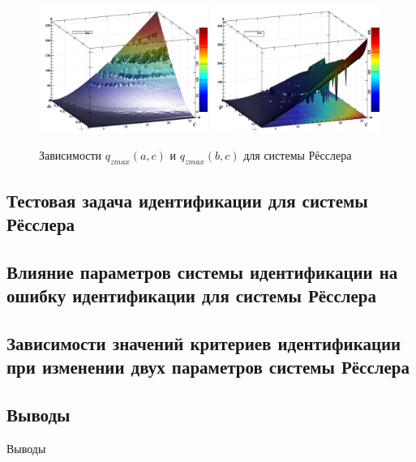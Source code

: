 \begin{figure}[ht!]
\begin{center}
  \includegraphics[width=0.49\textwidth]{p/cha/ross/ross_zmax_a_c.png}
  \hfill
  \includegraphics[width=0.49\textwidth]{p/cha/ross/ross_zmax_b_c.png}
\end{center}
  \caption{Зависимости $q_{zmax}(a,c)$ и  $q_{zmax}(b,c) $ для системы Рёсслера}
\label{atu:f:ross_q_zmax_ac_bc}
\end{figure}




\subsection{Тестовая задача идентификации для системы Рёсслера}  %



\subsection{Влияние параметров системы идентификации на ошибку идентификации для системы Рёсслера}  %


\subsection{Зависимости значений критериев идентификации при изменении двух параметров системы Рёсслера}  %




\subsection{Выводы}  %

Выводы




